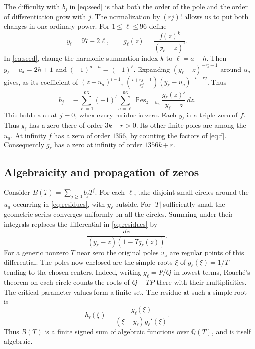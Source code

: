 \documentclass[11pt]{article}
\numberwithin{equation}{section}
\newcommand{\Q}{\mathbb Q}
\DeclareMathOperator{\Res}{Res}
\begin{document}
The difficulty with \(b_j\) in \eqref{eq:seed} is that both the order of
the pole and the order of differentiation grow with \(j\).
The normalization by \((rj)!\) allows us to put both changes in
one ordinary power. For \(1\le\ell\le96\) define
\[
                    y_\ell=97-2\ell,\qquad
                    g_\ell(z)=\frac{f(z)^k}{(y_\ell-z)^r}.
\]
In \eqref{eq:seed}, change the harmonic summation index \(h\) to
\(\ell=a-h\). Then \(y_\ell-u_a=2h+1\) and
\((-1)^{a+h}=(-1)^\ell\). Expanding \((y_\ell-z)^{-rj-1}\) around \(u_a\)
gives, as its coefficient of \((z-u_a)^{i-1}\),
\(\binom{i+rj-1}{rj}(y_\ell-u_a)^{-i-rj}\). Thus
\begin{equation}\label{eq:residues}
 b_j=-\sum_{\ell=1}^{96}(-1)^\ell
                 \sum_{a=\ell}^{96}
                 \Res_{z=u_a}\frac{g_\ell(z)^j}{y_\ell-z}\,dz .
\end{equation}
This holds also at \(j=0\), when every residue is zero. Each \(y_\ell\)
is a triple zero of \(f\). Thus \(g_\ell\) has a zero there of order
\(3k-r>0\). Its other finite poles are among the \(u_a\). At infinity
\(f\) has a zero of order \(1356\), by counting the factors of
\eqref{eq:f}. Consequently \(g_\ell\) has a zero at infinity of
order \(1356k+r\).

\subsection{Algebraicity and propagation of zeros}

Consider \(B(T)=\sum_{j\ge0}b_jT^j\). For each \(\ell\), take disjoint
small circles around the \(u_a\) occurring in \eqref{eq:residues},
with \(y_\ell\) outside. For \(|T|\) sufficiently small the geometric
series converges uniformly on all the circles. Summing under their
integrals replaces the differential in \eqref{eq:residues} by
\[
                    \frac{dz}{(y_\ell-z)(1-Tg_\ell(z))}.
\]
For a generic nonzero \(T\) near zero the original poles \(u_a\)
are regular points of this differential. The poles now enclosed
are the simple roots \(\xi\) of \(g_\ell(\xi)=1/T\) tending to the
chosen centers. Indeed, writing \(g_\ell=P/Q\) in lowest terms,
Rouch\'e's theorem on each circle counts the roots of \(Q-TP\)
there with their multiplicities. The critical parameter values form
a finite set. The residue at such a simple root is
\begin{equation}\label{eq:rootres}
 h_\ell(\xi)=\frac{g_\ell(\xi)}
                      {(\xi-y_\ell)g_\ell'(\xi)}.
\end{equation}
Thus \(B(T)\) is a finite signed sum of algebraic functions over
\(\Q(T)\), and is itself algebraic.
\end{document}
